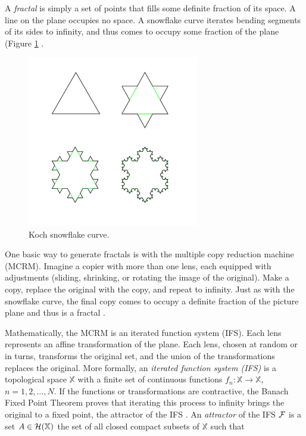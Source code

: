 \documentclass[english,11pt,letterpaper,onecolumn]{scrartcl}
\numberwithin{equation}{section}
\newcommand{\X}{\mathbb{X}}
\begin{document}
A \textit{fractal} is simply a set of points that fills some definite fraction 
of its space. A line on the plane occupies no space. A snowflake curve 
iterates bending segments of its sides to infinity, and thus comes to occupy 
some fraction of the plane (Figure \ref{fig:kochflake} 
\cite{Mandelbrot:1982:FGN}.

    \begin{figure}
        \centerline{\includegraphics[width = 0.6667\textwidth]{KochFlake}}
        \caption{\label{fig:kochflake} Koch snowflake 
curve.\protect\footnotemark}
    \end{figure}


One basic way to generate fractals is with the multiple copy reduction 
machine (MCRM). Imagine a copier with more than one lens, each equipped with 
adjustments (sliding, shrinking, or rotating the image of the original). Make 
a copy, replace the original with the copy, and repeat to infinity. Just as 
with the snowflake curve, the final copy comes to occupy a definite fraction 
of the picture plane and thus is a fractal \cite{chaosandfractals}. 

Mathematically, the MCRM is an iterated function system (IFS). Each lens 
represents an affine transformation of the plane. Each lens, chosen at random 
or in turns, transforms the original set, and the union of the transformations 
replaces the original. More formally, an \emph{iterated function system (IFS)}
is a topological space $\mathbb{X}$ with a finite set of continuous functions 
$f_{n}:\X\rightarrow \X$, 
$n=1,2,\dots,N$. If the functions or transformations are contractive, the 
Banach Fixed Point Theorem proves that iterating this process to infinity 
brings the original to a fixed point, the attractor of the IFS 
\cite{chaosandfractals, barnsley1985iterated, 10.2307/24893080, 
fractalseverywhere}. An \emph{attractor} of the IFS $\cal{F}$ is a set
$A\in \cal{H}(\X)$ the set of all closed compact subsets of $\X$ such that
\end{document}
